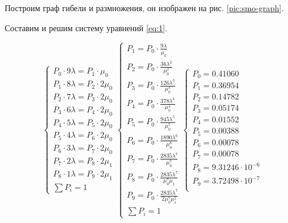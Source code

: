 Построим граф гибели и размножения, он изображен на рис. \ref{pic:smo-graph}.


Составим и решим систему уравнений \ref{eq:1}.

\begin{equation}
\label{eq:1}
\begin{cases}
	P_0 \cdot 9 \lambda = P_1 \cdot \mu_0 \\
	P_1 \cdot 8 \lambda = P_2 \cdot 2 \mu_0 \\
	P_2 \cdot 7 \lambda = P_3 \cdot 2 \mu_0 \\
	P_3 \cdot 6 \lambda = P_4 \cdot 2 \mu_0 \\
	P_4 \cdot 5 \lambda = P_5 \cdot 2 \mu_0 \\
	P_5 \cdot 4 \lambda = P_6 \cdot 2 \mu_0 \\
	P_6 \cdot 3 \lambda = P_7 \cdot 2 \mu_0 \\
	P_7 \cdot 2 \lambda = P_8 \cdot 2 \mu_1 \\
	P_8 \cdot 1 \lambda = P_9 \cdot 2 \mu_1 \\
	\sum P_i = 1
\end{cases}
\begin{cases}
	P_1 = P_0 \cdot \frac{9 \lambda}{\mu_0} \\
	P_2 = P_0 \cdot \frac{36 \lambda^2}{\mu_0^2} \\
	P_3 = P_0 \cdot \frac{126 \lambda^3}{\mu_0^3} \\
	P_4 = P_0 \cdot \frac{378 \lambda^4}{\mu_0^4} \\
	P_5 = P_0 \cdot \frac{945 \lambda^5}{\mu_0^5} \\
	P_6 = P_0 \cdot \frac{1890 \lambda^6}{\mu_0^6} \\
	P_7 = P_0 \cdot \frac{2835 \lambda^7}{\mu_0^7} \\
	P_8 = P_0 \cdot \frac{2835 \lambda^7}{\mu_0^7 \mu_1} \\
	P_9 = P_0 \cdot \frac{2835 \lambda^7}{2 \mu_0^7 \mu_1^2} \\
	\sum P_i = 1
\end{cases}
\begin{cases}
	P_0 = 0.41060 \\
	P_1 = 0.36954 \\
	P_2 = 0.14782 \\
	P_3 = 0.05174 \\
	P_4 = 0.01552 \\
	P_5 = 0.00388 \\
	P_6 = 0.00078 \\
	P_7 = 0.00078 \\ 
	P_8 = 9.31246 \cdot 10^{-6} \\
	P_9 = 3.72498 \cdot 10^{-7} \\
\end{cases}
\end{equation}

